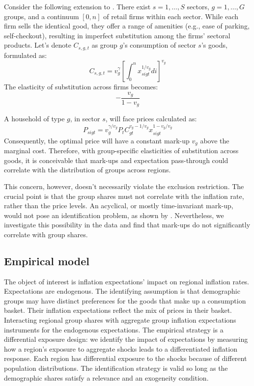 \documentclass[12pt]{article}
\begin{document}
Consider the following extension to \cite{AndersonRebeloWong:WP}. There exist $s=1,\ldots,S$ sectors, $g=1,\ldots,G$ groups, and a continuum $\left[0,n\right]$ of retail firms within each sector. While each firm sells the identical good, they offer a range of amenities (e.g., ease of parking, self-checkout), resulting in imperfect substitution among the firms' sectoral products. Let's denote $C_{s,g,t}$ as group $g$'s consumption of sector $s$'s goods, formulated as:
\begin{equation}
C_{s,g,t} = v_g^{\gamma}\left[\int_0^n x_{sigt}^{1/v_g}di\right]^{v_g}
\end{equation}
The elasticity of substitution across firms becomes:
\begin{equation}
-\frac{v_g}{1-v_g}
\end{equation}

A household of type $g$, in sector $s$, will face prices calculated as:
\begin{equation}
P_{sigt} = v^{\gamma/v_g}_gP_tC_{gt}^{v_g-1/v_g}x_{sigt}^{1-v_g/v_g}
\end{equation}
Consequently, the optimal price will have a constant mark-up $v_g$ above the marginal cost. Therefore, with group-specific elasticities of substitution across goods, it is conceivable that mark-ups and expectation pass-through could correlate with the distribution of groups across regions.

This concern, however, doesn't necessarily violate the exclusion restriction. The crucial point is that the group shares must not correlate with the inflation rate, rather than the price levels. An acyclical, or mostly time-invariant mark-up, would not pose an identification problem, as shown by \cite{AndersonRebeloWong:WP}. Nevertheless, we investigate this possibility in the data and find that mark-ups do not significantly correlate with group shares.

\subsection{Empirical model}

The object of interest is inflation expectations' impact on regional inflation rates. Expectations are endogenous. The identifying assumption is that demographic groups may have distinct preferences for the goods that make up a consumption basket. Their inflation expectations reflect the mix of prices in their basket. Interacting regional group shares with aggregate group inflation expectations instruments for the endogenous expectations. The empirical strategy is a differential exposure design: we identify the impact of expectations by measuring how a region's exposure to aggregate shocks leads to a differentiated inflation response. Each region has differential exposure to the shocks because of different population distributions. The identification strategy is valid so long as the demographic shares satisfy a relevance and an exogeneity condition.
\end{document}
